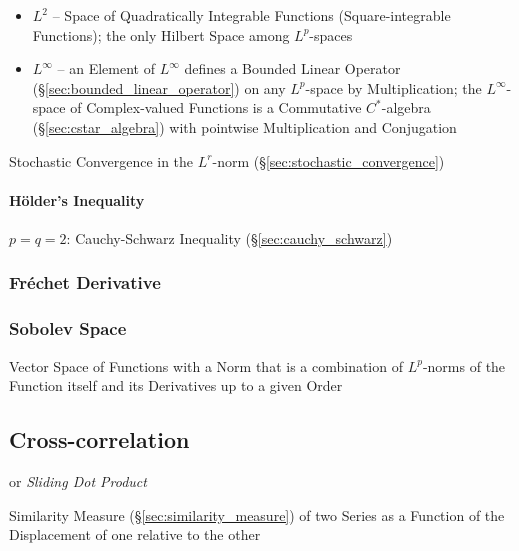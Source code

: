 \begin{itemize}
  \item $L^2$ -- Space of Quadratically Integrable Functions (Square-integrable
    Functions); the only Hilbert Space among $L^p$-spaces
  \item $L^\infty$ -- an Element of $L^\infty$ defines a Bounded Linear Operator
    (\S\ref{sec:bounded_linear_operator}) on any $L^p$-space by Multiplication;
    the $L^\infty$-space of Complex-valued Functions is a Commutative
    $C^*$-algebra (\S\ref{sec:cstar_algebra}) with pointwise Multiplication and
    Conjugation
\end{itemize}

\fist Stochastic Convergence in the $L^r$-norm
(\S\ref{sec:stochastic_convergence})



\paragraph{H\"older's Inequality}\label{sec:holders_inequality}\hfill

$p = q = 2$: Cauchy-Schwarz Inequality (\S\ref{sec:cauchy_schwarz})



\subsubsection{Fr\'echet Derivative}\label{sec:frechet_derivative}

\subsubsection{Sobolev Space}\label{sec:sobolev_space}

Vector Space of Functions with a Norm that is a combination of $L^p$-norms of
the Function itself and its Derivatives up to a given Order



\subsection{Cross-correlation}\label{sec:cross_correlation}

or \emph{Sliding Dot Product}

Similarity Measure (\S\ref{sec:similarity_measure}) of two Series as a Function
of the Displacement of one relative to the other

